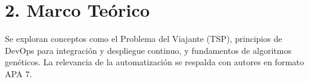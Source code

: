 \section*{2. Marco Teórico}
Se exploran conceptos como el Problema del Viajante (TSP), principios de DevOps para integración y despliegue continuo, y fundamentos de algoritmos genéticos. La relevancia de la automatización se respalda con autores en formato APA 7.
